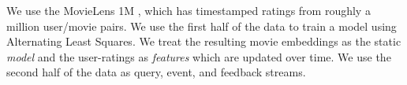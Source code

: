 We use the MovieLens 1M \cite{movielens1m}, which has timestamped ratings from roughly a million user/movie pairs. We use the first half of the data to train a model using Alternating Least Squares. We treat the resulting movie embeddings as the static \textit{model} and the user-ratings as \textit{features} which are updated over time. We use the second half of the data as query, event, and feedback streams. 







